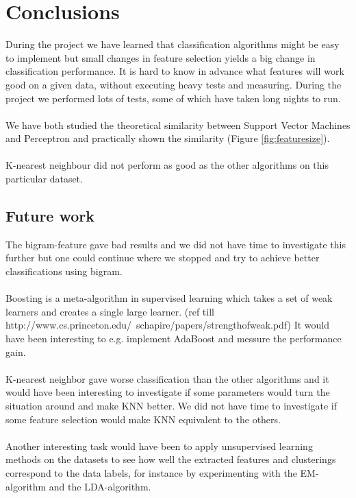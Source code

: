 \chapter{Conclusions}
During the project we have learned that classification algorithms might be easy to implement but small changes in feature selection yields a big change in classification performance. It is hard to know in advance what features will work good on a given data, without executing heavy tests and measuring. During the project we performed lots of tests, some of which have taken long nights to run. 
\\\\
We have both studied the theoretical similarity between Support Vector Machines and Perceptron and practically shown the similarity (Figure \ref{fig:featuresize}).
\\\\
K-nearest neighbour did not perform as good as the other algorithms on this particular dataset. 
\section{Future work}
The bigram-feature gave bad results and we did not have time to investigate this further but one could continue where we stopped and try to achieve better classifications using bigram. \\\\
Boosting is a meta-algorithm in supervised learning which takes a set of weak learners and creates a single large learner. (ref till http://www.cs.princeton.edu/~schapire/papers/strengthofweak.pdf) It would have been interesting to e.g. implement AdaBoost and messure the performance gain. \\\\
K-nearest neighbor gave worse classification than the other algorithms and it would have been interesting to investigate if some parameters would turn the situation around and make KNN better. We did not have time to investigate if some feature selection would make KNN equivalent to the others.
\\\\
Another interesting task would have been to apply unsupervised learning methods on the datasets to see how well the extracted features and clusterings correspond to the data labels, for instance by experimenting with the EM-algorithm and the LDA-algorithm.
